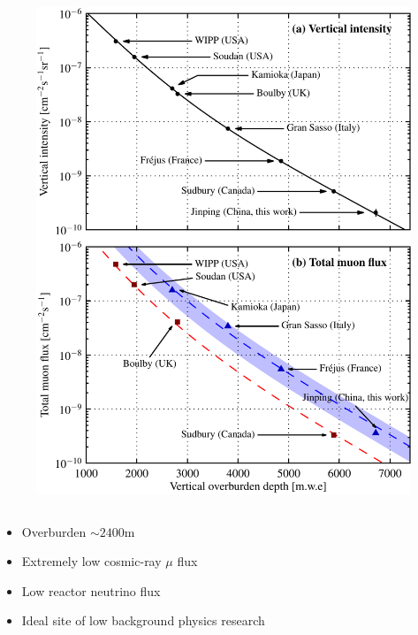 \documentclass{beamer}
\begin{document}
\begin{frame}
\begin{columns}
\begin{figure}
    \includegraphics[width=1.0\linewidth]{img/muonlab.pdf}
\end{figure}
\end{columns}
\begin{itemize}
    \item Overburden $\sim2400\mathrm{m}$
    \item Extremely low cosmic-ray $\mu$ flux
    \item Low reactor neutrino flux
    \item Ideal site of low background physics research
\end{itemize}
\end{frame}
\end{document}
